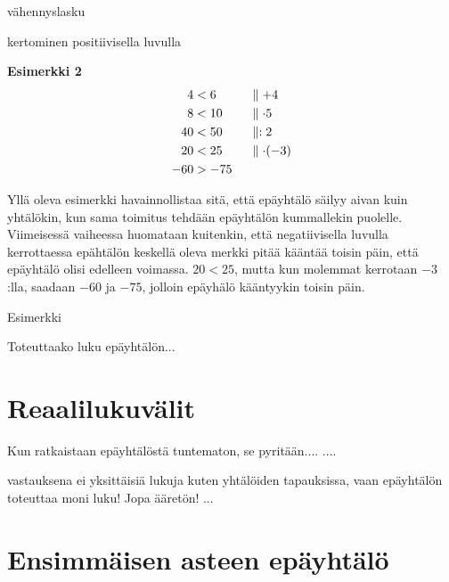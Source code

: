 vähennyslasku

\begin{lukusuora}{-1}{10}{12}

\lukusuorauusi
\end{lukusuora}

kertominen positiivisella luvulla

\begin{lukusuora}{-1}{10}{12}

\lukusuorauusi
\end{lukusuora}

\textbf{Esimerkki 2}
\begin{align*}
4&<6  \ \ \ \ \ &&\parallel +4 \\
8&<10 &&\parallel \cdot 5 \\
40&<50 &&\parallel :2 \\
20&<25 &&\parallel \cdot (-3) \\
-60&>-75
\end{align*}

Yllä oleva esimerkki havainnollistaa sitä, että epäyhtälö säilyy aivan kuin
yhtälökin, kun sama toimitus tehdään epäyhtälön kummallekin puolelle.
Viimeisessä vaiheessa huomataan kuitenkin, että negatiivisella luvulla
kerrottaessa epähtälön keskellä oleva merkki pitää kääntää toisin päin, että
epäyhtälö olisi edelleen voimassa. $20<25$, mutta kun molemmat kerrotaan
$-3$:lla, saadaan $-60$ ja $-75$, jolloin epäyhälö kääntyykin toisin päin.

Esimerkki

Toteuttaako luku epäyhtälön...

\section{Reaalilukuvälit}

Kun ratkaistaan epäyhtälöstä tuntematon, se pyritään.... ....

vastauksena ei yksittäisiä lukuja kuten yhtälöiden tapauksissa, vaan epäyhtälön toteuttaa moni luku! Jopa ääretön! ...


\section{Ensimmäisen asteen epäyhtälö}

